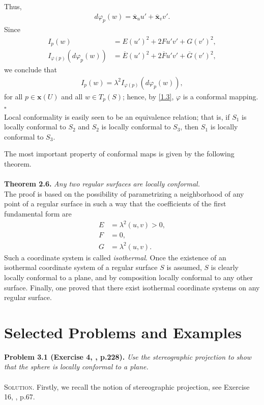 \documentclass[a4paper]{article}
\numberwithin{equation}{section}
\begin{document}
Thus, 
\begin{align}
d{\varphi _p}\left( w \right) = {\overline{\mathbf{x}} _u}u' + {\overline{\mathbf{x}} _v}v'.
\end{align}
Since
\begin{align}
{I_p}\left( w \right) &= E{\left( {u'} \right)^2} + 2Fu'v' + G{\left( {v'} \right)^2},\\
{I_{\varphi \left( p \right)}}\left( {d{\varphi _p}\left( w \right)} \right) &= \overline E {\left( {u'} \right)^2} + 2\overline F u'v' + \overline G {\left( {v'} \right)^2},
\end{align}
we conclude that 
\begin{align}
{I_p}\left( w \right) = {\lambda ^2}{I_{\varphi \left( p \right)}}\left( {d{\varphi _p}\left( w \right)} \right),
\end{align}
for all $p\in \mathbf{x}\left(U\right)$ and all $w\in T_p\left(S\right)$; hence, by \eqref{1.3}, $\varphi$ is a conformal mapping. \hfill $\square$\\

Local conformality is easily seen to be an equivalence relation; that is, if $S_1$ is locally conformal to $S_2$ and $S_2$ is locally conformal to $S_3$, then $S_1$ is locally conformal to $S_3$. 

The most important property of conformal maps is given by the following theorem.\\
\\
\textbf{Theorem 2.6.} \textit{Any two regular surfaces are locally conformal.}\\

The proof is based on the possibility of parametrizing a neighborhood of any point of a regular surface in such a way that the coefficients of the first fundamental form are
\begin{align}
E &= {\lambda ^2}\left( {u,v} \right) > 0,\\
F &= 0,\\
G &= {\lambda ^2}\left( {u,v} \right).
\end{align}
Such a coordinate system is called \textit{isothermal}. Once the existence of an isothermal coordinate system of a regular surface $S$ is assumed, $S$ is clearly locally conformal to a plane, and by composition locally conformal to any other surface. Finally, one proved that there exist isothermal coordinate systems on any regular surface.
\section{Selected Problems and Examples}
\textbf{Problem 3.1 (Exercise 4, \cite{2}, p.228).}  \textit{Use the stereographic projection to show that the sphere is locally conformal to a plane.}\\
\\
\textsc{Solution.} Firstly, we recall the notion of stereographic projection, see Exercise 16, \cite{2}, p.67.
\end{document}
